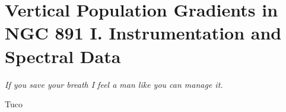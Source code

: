 


\chapter[NGC 891: Observations and spectral data]{Vertical Population
  Gradients in NGC 891 I. Instrumentation and Spectral Data}
\label{chap:891_1}
\epigraph{\fixspacing\emph{If you save your breath I feel a man like you can manage it.}}{Tuco}

\cleardoublepage

